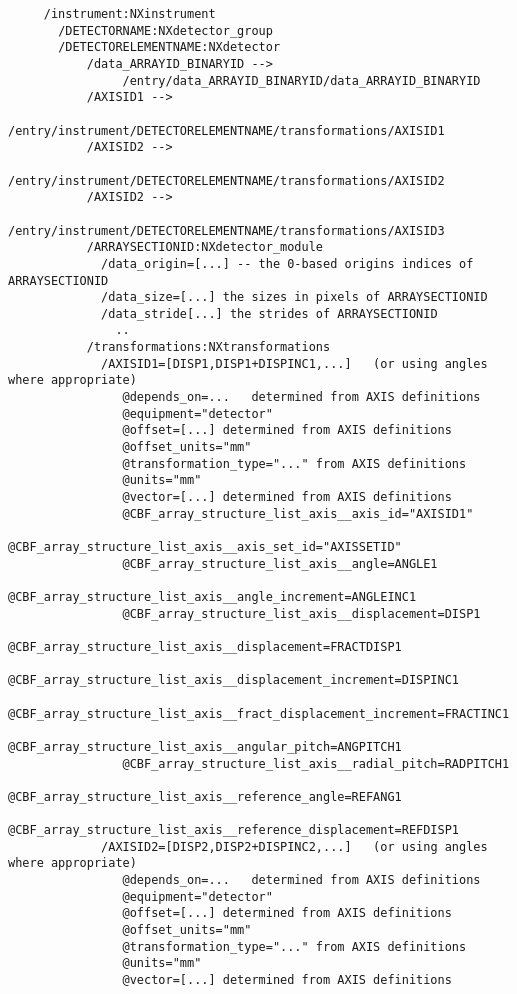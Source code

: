 \documentclass[11pt]{article}
\begin{document}
{\begin{verbatim}
     /instrument:NXinstrument
       /DETECTORNAME:NXdetector_group
       /DETECTORELEMENTNAME:NXdetector
           /data_ARRAYID_BINARYID -->
                /entry/data_ARRAYID_BINARYID/data_ARRAYID_BINARYID
           /AXISID1 -->
                /entry/instrument/DETECTORELEMENTNAME/transformations/AXISID1
           /AXISID2 -->
                /entry/instrument/DETECTORELEMENTNAME/transformations/AXISID2
           /AXISID2 -->
                /entry/instrument/DETECTORELEMENTNAME/transformations/AXISID3
           /ARRAYSECTIONID:NXdetector_module
             /data_origin=[...] -- the 0-based origins indices of ARRAYSECTIONID
             /data_size=[...] the sizes in pixels of ARRAYSECTIONID
             /data_stride[...] the strides of ARRAYSECTIONID
               ..
           /transformations:NXtransformations
             /AXISID1=[DISP1,DISP1+DISPINC1,...]   (or using angles where appropriate)
                @depends_on=...   determined from AXIS definitions
                @equipment="detector"
                @offset=[...] determined from AXIS definitions
                @offset_units="mm"
                @transformation_type="..." from AXIS definitions
                @units="mm"
                @vector=[...] determined from AXIS definitions
                @CBF_array_structure_list_axis__axis_id="AXISID1"
                @CBF_array_structure_list_axis__axis_set_id="AXISSETID"
                @CBF_array_structure_list_axis__angle=ANGLE1
                @CBF_array_structure_list_axis__angle_increment=ANGLEINC1
                @CBF_array_structure_list_axis__displacement=DISP1
                @CBF_array_structure_list_axis__displacement=FRACTDISP1
                @CBF_array_structure_list_axis__displacement_increment=DISPINC1
                @CBF_array_structure_list_axis__fract_displacement_increment=FRACTINC1
                @CBF_array_structure_list_axis__angular_pitch=ANGPITCH1
                @CBF_array_structure_list_axis__radial_pitch=RADPITCH1
                @CBF_array_structure_list_axis__reference_angle=REFANG1
                @CBF_array_structure_list_axis__reference_displacement=REFDISP1
             /AXISID2=[DISP2,DISP2+DISPINC2,...]   (or using angles where appropriate)
                @depends_on=...   determined from AXIS definitions
                @equipment="detector"
                @offset=[...] determined from AXIS definitions
                @offset_units="mm"
                @transformation_type="..." from AXIS definitions
                @units="mm"
                @vector=[...] determined from AXIS definitions

\end{verbatim}}
\end{document}
